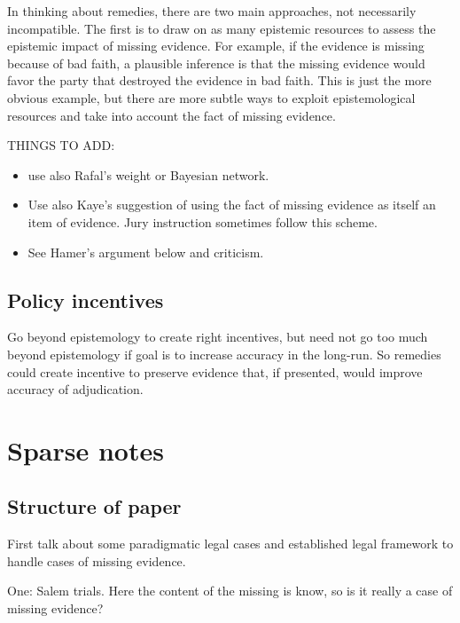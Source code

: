 \documentclass[
  10pt,
  dvipsnames,enabledeprecatedfontcommands]{scrartcl}
\begin{document}
In thinking about remedies, there are two main approaches, not
necessarily incompatible. The first is to draw on as many epistemic
resources to assess the epistemic impact of missing evidence. For
example, if the evidence is missing because of bad faith, a plausible
inference is that the missing evidence would favor the party that
destroyed the evidence in bad faith. This is just the more obvious
example, but there are more subtle ways to exploit epistemological
resources and take into account the fact of missing evidence.

THINGS TO ADD:

\begin{itemize}
\item
  use also Rafal's weight or Bayesian network.
\item
  Use also Kaye's suggestion of using the fact of missing evidence as
  itself an item of evidence. Jury instruction sometimes follow this
  scheme.
\item
  See Hamer's argument below and criticism.
\end{itemize}

\hypertarget{policy-incentives}{%
\subsection{Policy incentives}\label{policy-incentives}}

Go beyond epistemology to create right incentives, but need not go too
much beyond epistemology if goal is to increase accuracy in the
long-run. So remedies could create incentive to preserve evidence that,
if presented, would improve accuracy of adjudication.

\hypertarget{sparse-notes}{%
\section{Sparse notes}\label{sparse-notes}}

\hypertarget{structure-of-paper}{%
\subsection{Structure of paper}\label{structure-of-paper}}

First talk about some paradigmatic legal cases and established legal
framework to handle cases of missing evidence.

One: Salem trials. Here the content of the missing is know, so is it
really a case of missing evidence?
\end{document}
